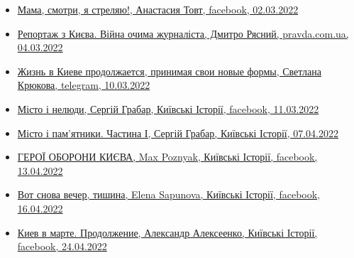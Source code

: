 \begin{itemize} %
\item \hyperlink{02_03_2022.fb.tovt_anastasia.1.mama_smotri_ja_streljaju}{%
Мама, смотри, я стреляю!, Анастасия Товт, facebook, 02.03.2022%
}

\item \hyperlink{04_03_2022.stz.news.ua.pravda.1.reportazh_z_kieva}{%
Репортаж з Києва. Війна очима журналіста, Дмитро Рясний, pravda.com.ua, 04.03.2022%
}

\item \hyperlink{10_03_2022.tg.krjukova_svetlana.1.zhizn_v_kieve}{%
Жизнь в Киеве продолжается, принимая свои новые формы, Светлана Крюкова, telegram, 10.03.2022
}

\item \hyperlink{11_03_2022.fb.fb_group.story_kiev_ua.2.misto_i_neljudy}{%
Місто і нелюди, Сергій Грабар, Київські Історії, facebook, 11.03.2022%
}

\item \hyperlink{07_04_2022.fb.fb_group.story_kiev_ua.1.misto_i_pamjatnyky_chastyna_1}{%
Місто і пам'ятники. Частина І, Сергій Грабар, Київські Історії, 07.04.2022%
}

\item \hyperlink{13_04_2022.fb.fb_group.story_kiev_ua.1.geroi_oborony_kieva}{%
ГЕРОЇ ОБОРОНИ КИЄВА, Max Poznyak, Київські Історії, facebook, 13.04.2022%
}

\item \hyperlink{16_04_2022.fb.fb_group.story_kiev_ua.1.vecher_tishina}{%
Вот снова вечер, тишина, Elena Sapunova, Київські Історії, facebook, 16.04.2022%
}

\item \hyperlink{24_04_2022.fb.fb_group.story_kiev_ua.1.kiev_v_marte_prodolzhenie}{%
Киев в марте. Продолжение, Александр Алексеенко, Київські Історії, facebook, 24.04.2022%
}

\end{itemize} %
